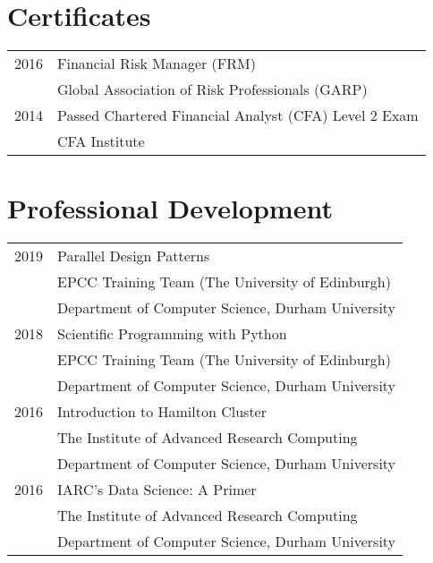 \documentclass[margin,line,pifont,palatino,courier]{res}
\begin{document}
\begin{resume}
\hrulefill

\section{\sc \bf Certificates}

\begin{tabular}{@{}p{0.8in}p{4in}}

2016 & Financial Risk Manager (FRM) \\
& Global Association of Risk Professionals (GARP)\\
 \rule{0pt}{4ex}2014 & Passed Chartered Financial Analyst (CFA) Level 2 Exam \\
& CFA Institute
\end{tabular}

\hrulefill

\section{\sc \bf Professional Development}

\begin{tabular}{@{}p{0.8in}p{4in}}

2019 & Parallel Design Patterns\\
&EPCC Training Team (The University of Edinburgh)\\
&Department of Computer Science, Durham University\\

\rule{0pt}{4ex}2018 & Scientific Programming with Python\\
&EPCC Training Team (The University of Edinburgh)\\
&Department of Computer Science, Durham University\\

\rule{0pt}{4ex}2016 & Introduction to Hamilton Cluster\\
&The Institute of Advanced Research Computing\\
&Department of Computer Science, Durham University\\

\rule{0pt}{4ex}2016 & IARC's Data Science: A Primer\\
&The Institute of Advanced Research Computing\\
&Department of Computer Science, Durham University\\
\end{tabular}

\hrulefill


\end{resume}
\end{document}
